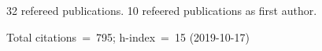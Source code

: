 32 refereed publications. 10 refeered publications as first author.

Total citations~=~795; h-index~=~15 (2019-10-17)